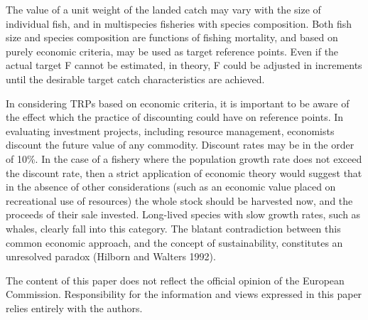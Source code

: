 \documentclass[12pt,oneline,a4paper,numbib]{ouparticle}
\numberwithin{equation}{subsection} %
\begin{document}
The value of a unit weight of the landed catch may vary with the size of individual fish, and in multispecies fisheries with species composition. Both fish size and species composition are functions of fishing mortality, and based on purely economic criteria, may be used as target reference points. Even if the actual target F cannot be estimated, in theory, F could be adjusted in increments until the desirable target catch characteristics are achieved.

In considering TRPs based on economic criteria, it is important to be aware of the effect which the practice of discounting could have on reference points. In evaluating investment projects, including resource management, economists discount the future value of any commodity. Discount rates may be in the order of 10\%. In the case of a fishery where the population growth rate does not exceed the discount rate, then a strict application of economic theory would suggest that in the absence of other considerations (such as an economic value placed on recreational use of resources) the whole stock should be harvested now, and the proceeds of their sale invested. Long-lived species with slow growth rates, such as whales, clearly fall into this category. The blatant contradiction between this common economic approach, and the concept of sustainability, constitutes an unresolved paradox (Hilborn and Walters 1992).

\begin{notes}[Acknowledgements]
The content of this paper does not reflect the official opinion of the European Commission. Responsibility for the information and views expressed in this paper relies entirely with the authors.
\end{notes}

\newpage


\end{document}
